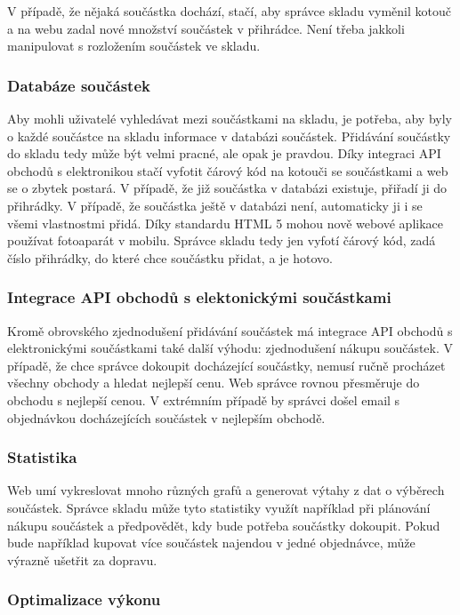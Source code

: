 \documentclass[12pt, a4paper, oneside]{article}
\begin{document}
V případě, že nějaká součástka dochází, stačí, aby správce skladu vyměnil kotouč a na webu zadal nové množství součástek v přihrádce. Není třeba jakkoli manipulovat s rozložením součástek ve skladu.


\subsubsection{Databáze součástek}

Aby mohli uživatelé vyhledávat mezi součástkami na skladu, je potřeba, aby byly o každé součástce na skladu informace v databázi součástek. Přidávání součástky do skladu tedy může být velmi pracné, ale opak je pravdou. Díky integraci API obchodů s elektronikou stačí vyfotit čárový kód na kotouči se součástkami a web se o zbytek postará. V případě, že již součástka v databázi existuje, přiřadí ji do přihrádky. V případě, že součástka ještě v databázi není, automaticky ji i se všemi vlastnostmi přidá. Díky standardu HTML 5 mohou nově webové aplikace používat fotoaparát v mobilu. Správce skladu tedy jen vyfotí čárový kód, zadá číslo přihrádky, do které chce součástku přidat, a je hotovo.

\subsubsection{Integrace API obchodů s elektonickými součástkami}

Kromě obrovského zjednodušení přidávání součástek má integrace API obchodů s elektronickými součástkami také další výhodu: zjednodušení nákupu součástek. V případě, že chce správce dokoupit docházející součástky, nemusí ručně procházet všechny obchody a hledat nejlepší cenu. Web správce rovnou přesměruje do obchodu s nejlepší cenou. V extrémním případě by správci došel email s objednávkou docházejících součástek v nejlepším obchodě.

\subsubsection{Statistika}

Web umí vykreslovat mnoho různých grafů a generovat výtahy z dat o výběrech součástek. Správce skladu může tyto statistiky využít například při plánování nákupu součástek a předpovědět, kdy bude potřeba součástky dokoupit. Pokud bude například kupovat více součástek najendou v jedné objednávce, může výrazně ušetřit za dopravu.

\subsubsection{Optimalizace výkonu}
\end{document}
